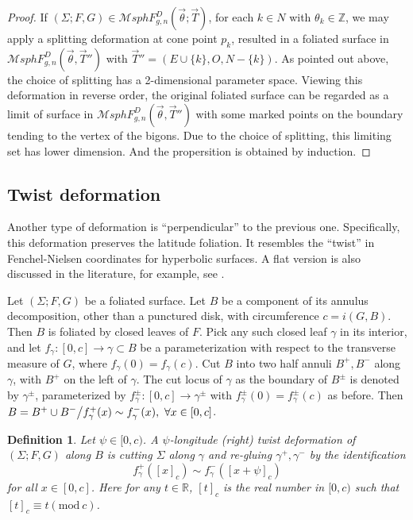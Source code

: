 \documentclass[pdflatex,sn-mathphys]{sn-jnl}%
\numberwithin{equation}{section}
\theoremstyle{thmstyleone}%
\newtheorem{definition}[theorem]{Definition}
\newcommand{\RR}{\mathbb{R}}
\newcommand{\ZZ}{\mathbb{Z}}
\newcommand{\MsphDF}[3]{\mathcal{M}sphF_{#1,#2}^D(#3)}
\newcommand{\MsphgnDFT}{\mathcal{M}sphF_{g,n}^D(\vec{\theta};\vec{T})}
\newcommand{\DEF}{\emph}
\begin{document}
\begin{proof}
    If $(\Sigma;F,G)\in \MsphgnDFT$, for each $k\in N$ with $\theta_k\in \ZZ$, we may apply a splitting deformation at cone point $p_k$, resulted in a foliated surface in $\MsphDF{g}{n}{\vec{\theta},\vec{T}''}$ with $\vec{T}''= ( E\cup\{ k \}, O, N-\{ k \} )$. As pointed out above, the choice of splitting has a 2-dimensional parameter space. Viewing this deformation in reverse order, the original foliated surface can be regarded as a limit of surface in $\MsphDF{g}{n}{\vec{\theta},\vec{T}''}$ with some marked points on the boundary tending to the vertex of the bigons. %
    Due to the choice of splitting, this limiting set has lower dimension. And the propersition is obtained by induction.
\end{proof}


\subsection{Twist deformation}
Another type of deformation is “perpendicular” to the previous one. Specifically, this deformation preserves the latitude foliation. %
It resembles the “twist” in Fenchel-Nielsen coordinates for hyperbolic surfaces. %
A flat version is also discussed in the literature, for example, see \cite[Section 3.1]{Gupt15}.

Let $(\Sigma; F,G)$ be a foliated surface. 
Let $B$ be a component of its annulus decomposition, other than a punctured disk, with circumference $c=i(G,B)$. Then $B$ is foliated by closed leaves of $F$. Pick any such closed leaf $\gamma$ in its interior, and let $f_\gamma:[0,c]\to \gamma\subset B$ be a parameterization with respect to the transverse measure of $G$, where $f_\gamma(0)=f_\gamma(c)$. Cut $B$ into two half annuli $B^+, B^-$ along $\gamma$, with $B^+$ on the left of $\gamma$. The cut locus of $\gamma$ as the boundary of $B^\pm$ is denoted by $\gamma^\pm$, parameterized by $f_\gamma^\pm:[0,c]\to \gamma^\pm$ with $f_\gamma^\pm(0)=f_\gamma^\pm(c)$ as before. Then $ B = B^+ \cup B^- \big{/} f_\gamma^+(x) \sim f_\gamma^-(x),\ \forall x\in[0,c] $.

\begin{definition}\label{def:twist}
    Let $\psi\in[0,c)$. A \DEF{$\psi$-longitude (right) twist deformation} of $(\Sigma;F,G)$ along $B$ is cutting $\Sigma$ along $\gamma$ and re-gluing $\gamma^+,\gamma^-$ by the identification
    \[ f_\gamma^+([x]_c) \sim f_\gamma^-([x+\psi]_c) \]
    for all $x\in [0,c]$. Here for any $t\in\RR$, $[t]_c$ is the real number in $[0,c)$ such that $[t]_c \equiv t (\mathrm{mod}\ c)$.
\end{definition}
\end{document}
